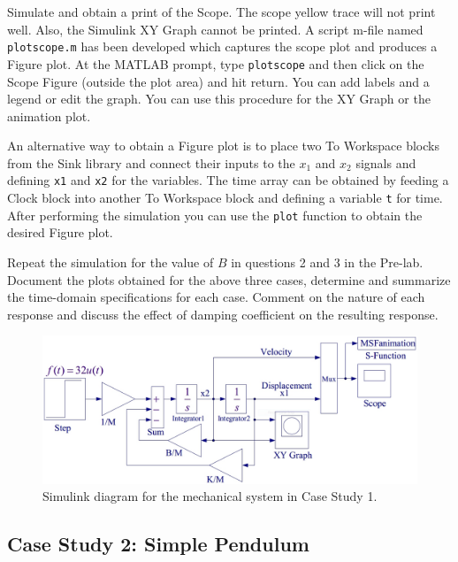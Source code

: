 \par
Simulate and obtain a print of the Scope.  The scope yellow trace will not print well.  Also, the Simulink XY Graph cannot be printed.  A script m-file named \texttt{plotscope.m} has been developed which captures the scope plot and produces a Figure plot.  At the MATLAB prompt, type \texttt{plotscope} and then click on the Scope Figure (outside the plot area) and hit return.  You can add labels and a legend or edit the graph.  You can use this procedure for the XY Graph or the animation plot.
\par
An alternative way to obtain a Figure plot is to place two To Workspace blocks from the Sink library and connect their inputs to the  $x_1$ and $x_2$ signals and defining \texttt{x1} and \texttt{x2} for the variables.  The time array can be obtained by feeding a Clock block into another To Workspace block and defining a variable \texttt{t} for time. After performing the simulation you can use the \texttt{plot} function to obtain the desired Figure plot.
\par
Repeat the simulation for the value of $B$ in questions 2 and 3 in the Pre-lab.  Document the plots obtained for the above three cases, determine and summarize the time-domain specifications for each case.  Comment on the nature of each response and discuss the effect of damping coefficient on the resulting response.

\begin{figure}[bht]
\centering
\includegraphics[width=.9\textwidth]{MechTransSimulink}
\caption{\footnotesize
        Simulink diagram for the mechanical system in Case Study 1.
        \label{fig.mechsimulink}
        }
\end{figure}

\subsection{Case Study 2: Simple Pendulum}
\label{cs.simplepend}

